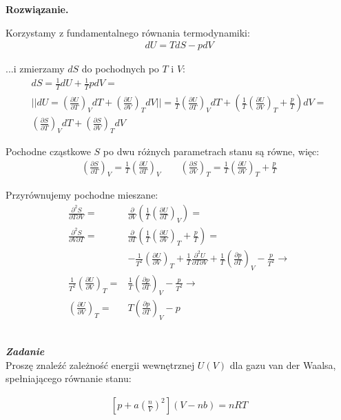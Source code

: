 \documentclass[11pt,a4paper]{article}
\newcommand{\Partial}[3]{\left( \frac{\partial #1}{\partial #2} \right)_{#3}}
\newcounter{zadanie}\newcommand{\zadanie}[1][]{\addtocounter{zadanie}{1} ~\\ {\bf \emph{Zadanie \arabic{zadanie} #1 }} \\}
\newenvironment{solution}{\vspace{1cm} \par\textbf{Rozwiązanie.} \vspace{1cm}}{}
\begin{document}
\begin{solution}

Korzystamy z fundamentalnego równania termodynamiki:
\begin{align*}
  dU = T dS - p dV
\end{align*}

...i zmierzamy $dS$ do pochodnych po $T$ i $V$:
\begin{align*}
  dS = \frac{1}{T}dU + \frac{1}{T} pdV = \\
  || dU = \Partial{U}{T}{V} dT + \Partial{U}{V}{T} dV || =
  \frac{1}{T} \Partial{U}{T}{V} dT + \left( \frac{1}{T} \Partial{U}{V}{T} + \frac{p}{T} \right) dV = \\
  \Partial{S}{T}{V} dT + \Partial{S}{V}{T} dV
\end{align*}

Pochodne cząstkowe $S$ po dwu różnych parametrach stanu są równe, więc:
\begin{align*}
  \Partial{S}{T}{V} = \frac{1}{T} \Partial{U}{T}{V} \qquad
  \Partial{S}{V}{T} = \frac{1}{T} \Partial{U}{V}{T} + \frac{p}{T}
\end{align*}

Przyrównujemy pochodne mieszane:
\begin{align*}
  \frac{\partial^{2}S}{\partial T \partial V} =& \frac{\partial}{\partial V} \left( \frac{1}{T} \Partial{U}{T}{V} \right) = \\
  \frac{\partial^{2}S}{\partial V \partial T} =& \frac{\partial}{\partial T} \left( \frac{1}{T} \Partial{U}{V}{T} + \frac{p}{T} \right) = \\
  & -\frac{1}{T^2} \Partial{U}{V}{T} + \frac{1}{T} \frac{\partial^2 U}{\partial T \partial V} + \frac{1}{T} \Partial{p}{T}{V} - \frac{p}{T^2} \to  \\
  \frac{1}{T^{2}} \Partial{U}{V}{T} =& \frac{1}{T} \Partial{p}{T}{V} - \frac{p}{T^2} \to \\
  \Partial{U}{V}{T} =& T \Partial{p}{T}{V} - p
\end{align*}

\newpage   
\end{solution}
\zadanie[]

Proszę znaleźć zależność energii wewnętrznej $U(V)$ dla gazu van der Waalsa,
spełniającego równanie stanu:

\begin{align*}
\left[p + a \left(\frac{n}{V}\right)^{2}\right](V - nb) = nRT
\end{align*}
\end{document}
